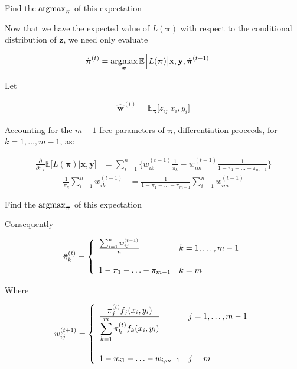 \documentclass{beamer}
\newcommand{\eqn}[1]{\begin{align*}
#1
\end{align*}}
\newcommand{\vect}[1]{\boldsymbol{\mathbf{#1}}}
\newcommand{\Bl}{\Big\{}
\newcommand{\Br}{\Big\}}
\newcommand{\argmax}{\operatornamewithlimits{argmax}}
\newcommand{\eqnset}[4]{
\[ #1 = #2 \left\{ \begin{array}{#3}
        #4
\end{array} \right. \] 
}
\newcommand{\vx}{\vect{x}}
\newcommand{\vy}{\vect{y}}
\newcommand{\vp}{\vect{\pi}}
\newcommand{\vph}{\hat{\vect{\pi}}}
\newcommand{\sumn}{\sum^n_{i=1}}
\newcommand{\sumk}{\sum^m_{k=1}}
\newcommand{\fab}{f_j}
\newcommand{\llp}{L(\vp)}
\begin{document}
\begin{frame}{Find the $\argmax_{\vp}$ of this expectation}
	
		
	Now that we have the expected value of $\llp$ with respect to the conditional distribution of $\vect{z}$, we need only evaluate
	
	
	\eqn{
		\vph^{(t)} &= \argmax_{\vp} \mathbb{E}\Big[\llp \big| \vx,\vy,\vph^{(t-1)} \Big]   
	}
	
	Let
	
	\eqn{
		\hat{\vect{w}}^{(t)} = \mathbb{E}_{\vp}\Big[  z_{ij} | x_i, y_i \Big]
	}
	
	Accounting for the $m-1$ free parameters of $\vp$, differentiation proceeds, for $k=1,\ldots,m-1$, as:
	
	\eqn{
		\frac{\partial}{\partial \pi_k} \mathbb{E}\Big[\llp \big| \vect{x},\vect{y}\Big]   &=      \sumn \Bl  w^{(t-1)}_{ik} \frac{1}{\pi_k} - w^{(t-1)}_{im} \frac{1}{1-\pi_1-\ldots-\pi_{m-1}}   \Br
	}
	\eqn{
		\frac{1}{\pi_k} \sumn w_{ik}^{(t-1)} &= \frac{1}{1-\pi_1-\ldots-\pi_{m-1}} \sumn w_{im}^{(t-1)}
	}
	
	
\end{frame}















\begin{frame}{Find the $\argmax_{\vp}$ of this expectation}
	
	
	Consequently
	\eqnset{\hat{\pi}^{(t)}_k }{}{ll}{
		\frac{\sumn w^{(t-1)}_{ij}}{n}			& k=1,\ldots,m-1	\\
		\vspace{1mm} & \\
		1-\pi_1-\ldots-\pi_{m-1}		& k=m
	}
	
		Where
	\eqnset{w^{(t+1)}_{ij}}{}{ll}{
		\frac{\displaystyle\pi^{(t)}_{j} \fab(x_i,y_i)}{\displaystyle\sumk \pi^{(t)}_{k}f_k(x_i,y_i)}				& j=1,\ldots,m-1	\\
		\vspace{1mm} & \\
		1 - w_{i1} - \ldots - w_{i,m-1}		& j=m
	}
	
\end{frame}
\end{document}
